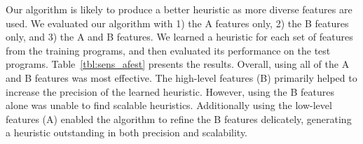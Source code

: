 

Our algorithm is likely to produce a better heuristic as more diverse
features are used. %
We evaluated our algorithm with 1) the A features only, 2) the B
features only, and 3) the A and B features.  We learned a heuristic for
each set of features from the training programs, and then evaluated
its performance on the test programs.  Table~\ref{tbl:sens_afest}
presents the results.  Overall, using all of the A and B features was
most effective.  The high-level features (B) primarily helped to
increase the precision of the learned heuristic. However, using the B
features alone was unable to find scalable heuristics.  Additionally using the
low-level features (A) enabled the algorithm to refine the B features
delicately, generating a heuristic outstanding in both precision and scalability.


